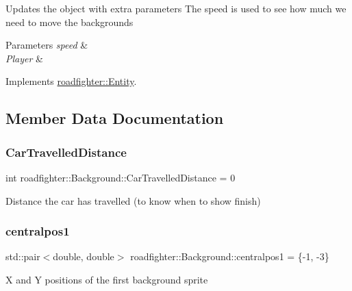 Updates the object with extra parameters The speed is used to see how much we need to move the backgrounds 
\begin{DoxyParams}{Parameters}
{\em speed} & \\
\hline
{\em Player} & \\
\hline
\end{DoxyParams}


Implements \hyperlink{classroadfighter_1_1Entity_a611ba56595dd2137d308876ba820cc09}{roadfighter\+::\+Entity}.



\subsection{Member Data Documentation}
\mbox{\label{classroadfighter_1_1Background_a084a46a73deb42183773dfd29adbc106}} 
\subsubsection{\texorpdfstring{Car\+Travelled\+Distance}{CarTravelledDistance}}
{\footnotesize\ttfamily int roadfighter\+::\+Background\+::\+Car\+Travelled\+Distance = 0\hspace{0.3cm}{\ttfamily [protected]}}

Distance the car has travelled (to know when to show finish) \mbox{\label{classroadfighter_1_1Background_a490223cc4c2fe332df45506a26bc48ba}} 
\subsubsection{\texorpdfstring{centralpos1}{centralpos1}}
{\footnotesize\ttfamily std\+::pair$<$double, double$>$ roadfighter\+::\+Background\+::centralpos1 = \{-\/1, -\/3\}\hspace{0.3cm}{\ttfamily [protected]}}

X and Y positions of the first background sprite \mbox{\label{classroadfighter_1_1Background_a5acc0e95972469cf195057e862e88b1a}} 
